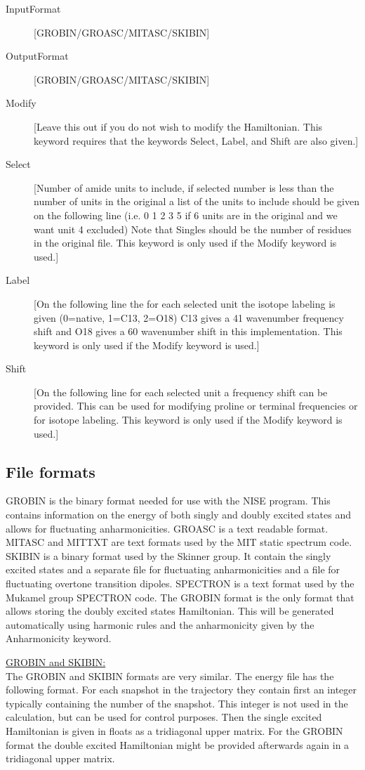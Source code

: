 \begin{description}
\item[InputFormat] [GROBIN/GROASC/MITASC/SKIBIN]
\item[OutputFormat] [GROBIN/GROASC/MITASC/SKIBIN]
\item[Modify][Leave this out if you do not wish to modify the Hamiltonian. This keyword requires that the keywords Select, Label, and Shift are also given.]
\item[Select] [Number of amide units to include, if selected number is less than the number of units in the original a list of the units to include should be given on the following line (i.e. 0 1 2 3 5 if 6 units are in the original and we want unit 4 excluded) Note that Singles should be the number of residues in the original file. This keyword is only used if the Modify keyword is used.]
\item[Label] [On the following line the for each selected unit the isotope labeling is given (0=native, 1=C13, 2=O18) C13 gives a 41 wavenumber frequency shift and O18 gives a 60 wavenumber shift in this implementation. This keyword is only used if the Modify keyword is used.]
\item[Shift] [On the following line for each selected unit a frequency shift can be provided. This can be used for modifying proline or terminal frequencies or for isotope labeling. This keyword is only used if the Modify keyword is used.]   
\end{description}

\subsection{File formats}
GROBIN is the binary format needed for use with the NISE program. This contains information on the energy of both singly and doubly excited states and allows for fluctuating anharmonicities.
GROASC is a text readable format.
MITASC and MITTXT are text formats used by the MIT static spectrum code.
SKIBIN is a binary format used by the Skinner group. It contain the singly excited states and a
separate file for fluctuating anharmonicities and a file for fluctuating overtone transition dipoles.
SPECTRON is a text format used by the Mukamel group SPECTRON code.
The GROBIN format is the only format that allows storing the doubly excited states Hamiltonian. This will be generated automatically using harmonic rules and the anharmonicity given by the Anharmonicity keyword.

\noindent
\underline{GROBIN and SKIBIN:}\\
The GROBIN and SKIBIN formats are very similar.
The energy file has the following format.
For each snapshot in the trajectory they contain first an integer typically containing the number of the snapshot. This integer is not used in the calculation, but can be used for control purposes.
Then the single excited Hamiltonian is given in floats as a tridiagonal upper matrix. For the GROBIN
format the double excited Hamiltonian might be provided afterwards again in a tridiagonal upper matrix.

